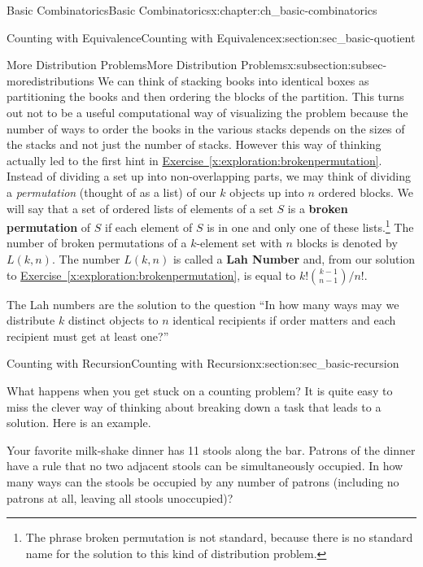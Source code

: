 \documentclass[oneside,10pt,]{book}
\newcommand{\terminology}[1]{\textbf{#1}}
\numberwithin{equation}{chapter}
\begin{document}
\begin{chapterptx}{Basic Combinatorics}{}{Basic Combinatorics}{}{}{x:chapter:ch_basic-combinatorics}
\begin{sectionptx}{Counting with Equivalence}{}{Counting with Equivalence}{}{}{x:section:sec_basic-quotient}
\begin{subsectionptx}{More Distribution Problems}{}{More Distribution Problems}{}{}{x:subsection:subsec-moredistributions}
We can think of stacking books into identical boxes as partitioning the books and then ordering the blocks of the partition. This turns out not to be a useful computational way of visualizing the problem because the number of ways to order the books in the various stacks depends on the sizes of the stacks and not just the number of stacks. However this way of thinking actually led to the first hint in \hyperref[x:exploration:brokenpermutation]{Exercise~\ref{x:exploration:brokenpermutation}}. Instead of dividing a set up into non-overlapping parts, we may think of dividing a \emph{permutation} (thought of as a list) of our \(k\) objects up into \(n\) ordered blocks. We will say that a set of ordered lists of elements of a set \(S\) is a \terminology{broken permutation}   of \(S\) if each element of \(S\) is in one and only one of these lists.\footnote{The phrase broken permutation is not standard, because there is no standard name for the solution to this kind  of distribution problem.\label{g:fn:idm2451}} The number of broken permutations of a \(k\)-element set with \(n\) blocks is denoted by \(L(k,n)\). The number \(L(k,n)\) is called a \terminology{Lah Number} and, from our solution to \hyperref[x:exploration:brokenpermutation]{Exercise~\ref{x:exploration:brokenpermutation}}, is equal to \(k!\binom{k-1}{n-1}/n!\).%
\par
The Lah numbers are the solution to the question ``In how many ways may we distribute \(k\) distinct objects to \(n\) identical recipients if order matters and each recipient must get at least one?''%
\end{subsectionptx}
\end{sectionptx}
%
%
\typeout{************************************************}
\typeout{************************************************}
%
\begin{sectionptx}{Counting with Recursion}{}{Counting with Recursion}{}{}{x:section:sec_basic-recursion}
\begin{introduction}{}%
What happens when you get stuck on a counting problem?  It is quite easy to miss the clever way of thinking about breaking down a task that leads to a solution.  Here is an example.%
\par
Your favorite milk-shake dinner has 11 stools along the bar.  Patrons of the dinner have a rule that no two adjacent stools can be simultaneously occupied.  In how many ways can the stools be occupied by any number of patrons (including no patrons at all, leaving all stools unoccupied)?%

\end{introduction}
\end{sectionptx}
\end{chapterptx}
\end{document}

